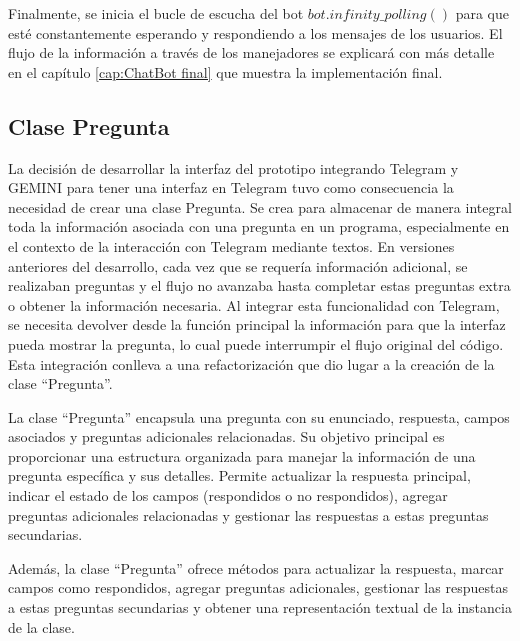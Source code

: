 Finalmente, se inicia el bucle de escucha del bot $bot.infinity\_polling()$ para que esté constantemente esperando y respondiendo a los mensajes de los usuarios. El flujo de la información a través de los manejadores se explicará con más detalle en el capítulo \ref{cap:ChatBot final} que muestra la implementación final. 

\subsection{Clase Pregunta}
La decisión de desarrollar la interfaz del prototipo integrando Telegram y GEMINI para tener una interfaz en Telegram tuvo como consecuencia la necesidad de crear una clase Pregunta. Se crea para almacenar de manera integral toda la información asociada con una pregunta en un programa, especialmente en el contexto de la interacción con Telegram mediante textos. En versiones anteriores del desarrollo, cada vez que se requería información adicional, se realizaban preguntas y el flujo no avanzaba hasta completar estas preguntas extra o obtener la información necesaria. Al integrar esta funcionalidad con Telegram, se necesita devolver desde la función principal la información para que la interfaz pueda mostrar la pregunta, lo cual puede interrumpir el flujo original del código. Esta integración conlleva a una refactorización que dio lugar a la creación de la clase ``Pregunta''.

La clase ``Pregunta'' encapsula una pregunta con su enunciado, respuesta, campos asociados y preguntas adicionales relacionadas. Su objetivo principal es proporcionar una estructura organizada para manejar la información de una pregunta específica y sus detalles. Permite actualizar la respuesta principal, indicar el estado de los campos (respondidos o no respondidos), agregar preguntas adicionales relacionadas y gestionar las respuestas a estas preguntas secundarias.

Además, la clase ``Pregunta'' ofrece métodos para actualizar la respuesta, marcar campos como respondidos, agregar preguntas adicionales, gestionar las respuestas a estas preguntas secundarias y obtener una representación textual de la instancia de la clase.

